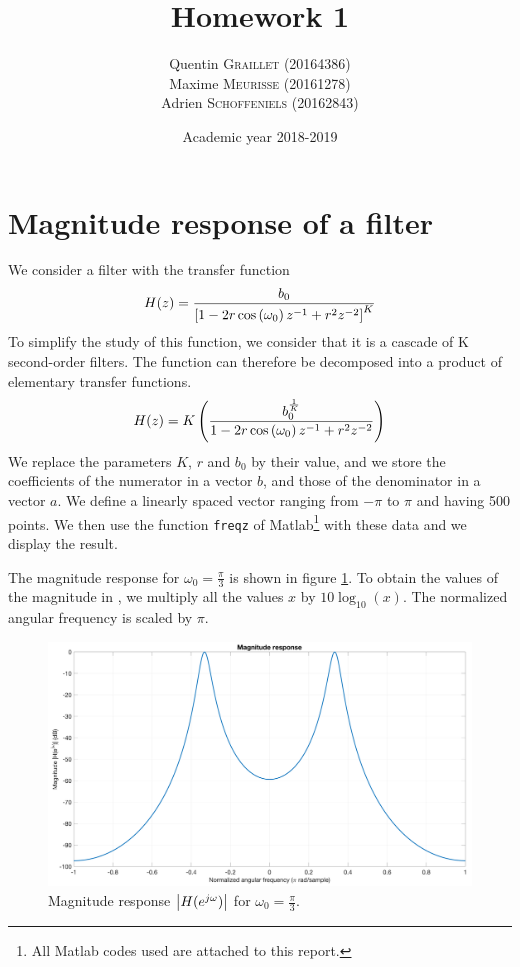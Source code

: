 \documentclass[a4paper, 12pt]{article}
\title{Homework 1}
\author{
    Quentin \textsc{Graillet} (20164386)\\
    Maxime \textsc{Meurisse} (20161278)\\
    Adrien \textsc{Schoffeniels} (20162843)\\
}
\date{Academic year 2018-2019}
\begin{document}
	
	\section{Magnitude response of a filter}
	We consider a filter with the transfer function
	\begin{equation*}
	    H(z) = \dfrac{b_0}{\left[1-2r\cos\left(\omega_0\right)z^{-1}+r^2z^{-2}\right]^K}
	\end{equation*}
	To simplify the study of this function, we consider that it is a cascade of K second-order filters. The function can therefore be decomposed into a product of elementary transfer functions.
	\begin{equation*}
	    H(z) = K\left(\dfrac{b_0^{\frac{1}{K}}}{1-2r\cos\left(\omega_0\right)z^{-1}+r^2z^{-2}}\right)
	\end{equation*}
	We replace the parameters $K$, $r$ and $b_0$ by their value, and we store the coefficients of the numerator in a vector $b$, and those of the denominator in a vector $a$. We define a linearly spaced vector ranging from $-\pi$ to $\pi$ and having \num{500} points. We then use the function \texttt{freqz} of Matlab\footnote{All Matlab codes used are attached to this report.} with these data and we display the result.\par
	The magnitude response for $\omega_0 = \frac{\pi}{3}$ is shown in figure \ref{fig:magnitude_response_a}. To obtain the values of the magnitude in \deci\bel, we multiply all the values $x$ by $10\log_{10}(x)$. The normalized angular frequency is scaled by $\pi$.\par
	\begin{figure}[!ht]
	    \centering
	    \includegraphics[width=1\textwidth]{resources/pdf/magnitude_response_a.pdf}
	    \caption{Magnitude response $\left|H(e^{j\omega})\right|$ for $\omega_0 = \frac{\pi}{3}$.}
	    \label{fig:magnitude_response_a}
	\end{figure}
\end{document}
